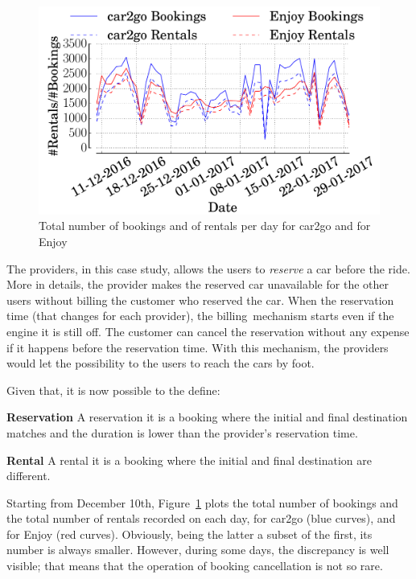 \begin{figure}
\centering
 \includegraphics[width=0.85\columnwidth]{figures/bookings.pdf}
 \caption{Total number of bookings and of rentals per day for car2go and for Enjoy \label{fig:bookings}}
\end{figure}
The providers, in this case study, allows the users to \textit{reserve} a car before the ride. More in details, the provider makes the reserved car unavailable for the other users without billing the customer who reserved the car. When the reservation time (that changes for each provider), the billing mechanism starts even if the engine it is still off. The customer can cancel the reservation without any expense if it happens before the reservation time. With this mechanism, the providers would let the possibility to the users to reach the cars by foot.

Given that, it is now possible to the define:
\begin{definition}{\textbf{Reservation}}
	\label{def:reservation} A reservation it is a booking where the initial and final destination matches and the duration is lower than the provider's reservation time.
\end{definition}

\begin{definition}{\textbf{Rental}}
	\label{def:rental} A rental it is a booking where the initial and final destination are different.
\end{definition}


Starting from December 10th, Figure~\ref{fig:bookings} plots the total number of bookings and the total number of rentals recorded on each day, for car2go (blue curves), and for Enjoy (red curves). Obviously, being the latter a subset of the first, its number is always smaller. However, during some days, the discrepancy is well visible; that means that the operation of booking cancellation is not so rare.

